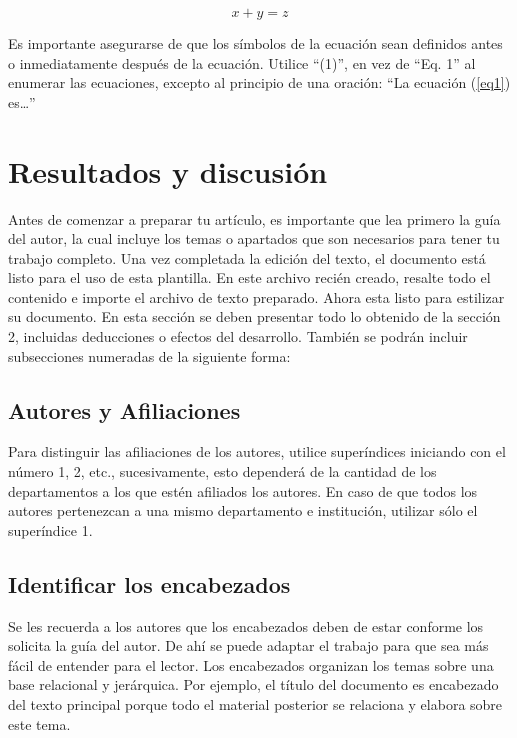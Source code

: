     \begin{equation}
        \label{eq1}
        x + y = z 
    \end{equation}
    
    Es importante asegurarse de que los símbolos de la ecuación sean definidos antes o inmediatamente después de la ecuación. Utilice “(1)”, en vez de “Eq. 1” al enumerar las ecuaciones, excepto al principio de una oración: “La ecuación (\ref{eq1}) es…”
    
    \section{Resultados y discusión}
    
    Antes de comenzar a preparar tu artículo, es importante que lea primero la guía del autor, la cual incluye los temas o apartados que son necesarios para tener tu trabajo completo.
    Una vez completada la edición del texto, el documento está listo para el uso de esta plantilla. En este archivo recién creado, resalte todo el contenido e importe el archivo de texto preparado. Ahora esta listo para estilizar su documento.
    En esta sección se deben presentar todo lo obtenido de la sección 2, incluidas deducciones o efectos del desarrollo. También se podrán incluir subsecciones numeradas de la siguiente forma:
    
    \subsection{Autores y Afiliaciones}
    
    Para distinguir las afiliaciones de los autores, utilice superíndices iniciando con el número 1, 2, etc., sucesivamente, esto dependerá de la cantidad de los departamentos a los que estén afiliados los autores. En caso de que todos los autores pertenezcan a una mismo departamento e institución, utilizar sólo el superíndice 1. 
    
    \subsection{Identificar los encabezados}
    
    Se les recuerda a los autores que los encabezados deben de estar conforme los solicita la guía del autor. De ahí se puede adaptar el trabajo para que sea más fácil de entender para el lector.
    Los encabezados organizan los temas sobre una base relacional y jerárquica. Por ejemplo, el título del documento es encabezado del texto principal porque todo el material posterior se relaciona y elabora sobre este tema. 
    
